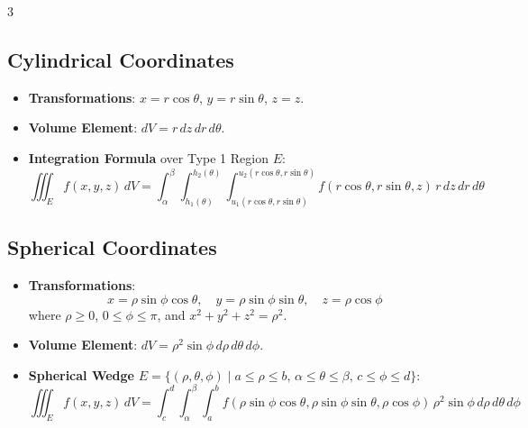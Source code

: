 \documentclass[10pt,landscape,a4paper]{article}
\begin{document}
\begin{multicols*}{3}
\subsection{Cylindrical Coordinates}
\begin{itemize}
    \item \textbf{Transformations}: $x = r\cos\theta$, $y = r\sin\theta$, $z = z$.
    \item \textbf{Volume Element}: $dV = r\,dz\,dr\,d\theta$.
    \item \textbf{Integration Formula} over Type 1 Region $E$:
    \[ \iiint_E f(x,y,z)\,dV = \int_{\alpha}^{\beta} \int_{h_1(\theta)}^{h_2(\theta)} \int_{u_1(r\cos\theta, r\sin\theta)}^{u_2(r\cos\theta, r\sin\theta)} f(r\cos\theta, r\sin\theta, z)\,r\,dz\,dr\,d\theta \]
\end{itemize}

\subsection{Spherical Coordinates}
\begin{itemize}
    \item \textbf{Transformations}:
    \[ x = \rho\sin\phi\cos\theta, \quad y = \rho\sin\phi\sin\theta, \quad z = \rho\cos\phi \]
    where $\rho \geq 0$, $0 \leq \phi \leq \pi$, and $x^2 + y^2 + z^2 = \rho^2$.
    \item \textbf{Volume Element}: $dV = \rho^2\sin\phi\,d\rho\,d\theta\,d\phi$.
    \item \textbf{Spherical Wedge} $E = \{ (\rho, \theta, \phi) \mid a \leq \rho \leq b, \, \alpha \leq \theta \leq \beta, \, c \leq \phi \leq d \}$:
    \[ \iiint_E f(x,y,z)\,dV = \int_c^d \int_{\alpha}^{\beta} \int_a^b f(\rho\sin\phi\cos\theta, \rho\sin\phi\sin\theta, \rho\cos\phi)\,\rho^2\sin\phi\,d\rho\,d\theta\,d\phi \]
\end{itemize}

\end{multicols*}
\end{document}
